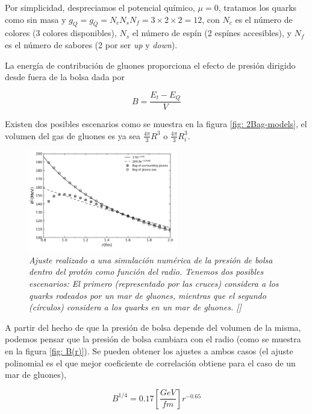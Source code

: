 Por simplicidad, despreciamos el potencial químico, $\mu=0$, tratamos los quarks como sin masa y ${g}_{Q} = {g}_{\bar{Q}} = {N}_{c}{N}_{s}{N}_{f} = 3 \times 2 \times 2 = 12$, con ${N}_{c}$ es el número de colores (3 colores disponibles), ${N}_{s}$ el número de espín (2 espínes accesibles), y ${N}_{f}$ es el número de sabores (2 por ser \emph{up} y \emph{down}).


La energía de contribución de gluones proporciona el efecto de presión dirigido desde fuera de la bolsa dada por

\begin{equation}
B = \frac{{E}_{t} - {E}_{Q}}{V}
\end{equation}

Existen dos posibles escenarios como se muestra en la figura \ref{fig: 2Bag-models}, el volumen del gas de gluones es ya sea $\frac{4 \pi}{3} {R}^{3}$ o $\frac{4\pi}{3}{R}_{i}^{3}$.

\begin{figure}
\centering\includegraphics[width=0.58\textwidth]{./Images/B(R).png}

\caption[Presión de bolsa como función del radio del protón]{\emph{Ajuste realizado a una simulación numérica de la presión de bolsa dentro del protón como función del radio. Tenemos dos posibles escenarios: El primero (representado por las cruces) considera a los quarks rodeados por un mar de gluones, mientras que el segundo (círculos) considera a los quarks en un mar de gluones. []}}
\label{fig: B(r)}
\end{figure}

A partir del hecho de que la presión de bolsa depende del volumen de la misma, podemos pensar que la presión de bolsa cambiara con el radio (como se muestra en la figura \eqref{fig: B(r)}). Se pueden obtener los ajustes a ambos casos (el ajuste polinomial es el que mejor coeficiente de correlación obtiene para el caso de un mar de gluones), 

\begin{equation}\label{eq-B(r)-seagluons}
{B}^{1/4} = 0.17 \left[\frac{GeV}{fm}\right] {r}^{-0.65}
\end{equation}

